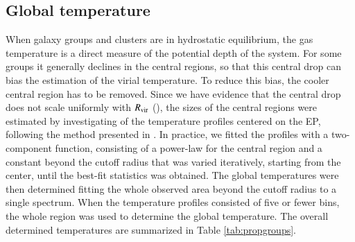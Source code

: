 \documentclass{aa} %
\begin{document}
\subsection{Global temperature}
When galaxy groups and clusters are in hydrostatic equilibrium, the gas
temperature is a direct measure of the potential depth of the
system. For some groups it generally declines in the central regions,
so that this central drop can bias the estimation of the virial
temperature. To reduce this bias, the cooler central region
has to be removed. Since we have evidence that the central drop does
not scale uniformly with $R_{\rm vir}$ (\citealt{2010A&A...513A..37H}),
the sizes of the central regions were estimated by investigating of
the temperature profiles centered on the EP, following the method
presented in \citet{2011A&A...535A.105E}. In practice, we fitted the
profiles with a two-component function, consisting of a power-law for
the central region and a constant beyond the cutoff radius that was
varied iteratively, starting from the center, until the best-fit
statistics was obtained. The global temperatures were
then determined fitting the whole observed area
beyond the cutoff radius to a single spectrum. When the temperature profiles consisted of
five or fewer bins, the whole region was used to determine the
global temperature. The overall determined temperatures are summarized in Table \ref{tab:propgroups}. 
\end{document}
